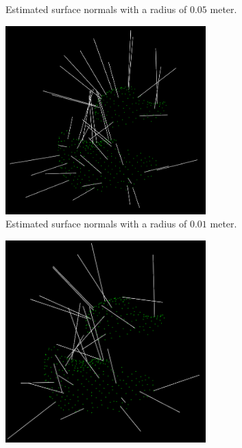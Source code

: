 \documentclass[../main.tex]{subfiles}
\begin{document}
\begin{figure}[H]
\begin{subfigure}[t]{0.17\textwidth}
        \caption{Estimated surface normals with a radius of $0.05$ meter.}
        \label{subfig:sds_normals_0.05}
    \end{subfigure}
    \begin{subfigure}[t]{0.18\textwidth}
        \centering
        \captionsetup{width=.85\textwidth}
        \includegraphics[width=0.85\textwidth]{figures/simulated_depth_sensor/global/normals_01.png}
        \caption{Estimated surface normals with a radius of $0.01$ meter.}
        \label{subfig:sds_normals_0.01}
    \end{subfigure}
    \begin{subfigure}[t]{0.17\textwidth}
        \centering
        \captionsetup{width=0.85\textwidth}
        \includegraphics[width=0.85\textwidth]{figures/simulated_depth_sensor/global/normals_005.png}

\end{subfigure}
\end{figure}
\end{document}
